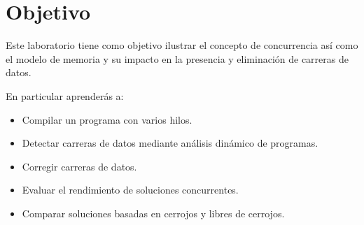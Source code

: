 \section{Objetivo}

Este laboratorio tiene como objetivo ilustrar el concepto de concurrencia así 
como el modelo de memoria y su impacto en la presencia y eliminación de carreras de datos.

En particular aprenderás a:


\begin{itemize}

  \item Compilar un programa con varios hilos.
  \item Detectar carreras de datos mediante análisis dinámico de programas.
  \item Corregir carreras de datos.
  \item Evaluar el rendimiento de soluciones concurrentes.
  \item Comparar soluciones basadas en cerrojos y libres de cerrojos.

\end{itemize}
